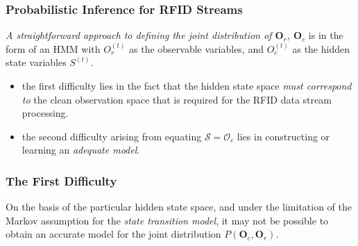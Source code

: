 
\begin{frame}
\frametitle{Probabilistic Inference for RFID Streams}

\textit{A straightforward approach to defining the joint distribution of $\mathbf{O}_r$, $\mathbf{O}_c$} is in the form of an HMM with $O^{(t)}_r$ as the observable variables, and $O^{(t)}_c$ as the hidden state variables $S^{(t)}$.

\begin{itemize}

  \item the first difficulty lies in the fact that the hidden state space \emph{must correspond to} the clean observation space that is required for the RFID data stream processing.

  \item the second difficulty arising from equating $\mathcal{S} = \mathcal{O}_c$ lies in constructing or learning an \emph{adequate model}.

\end{itemize}

\end{frame}


\begin{frame}
\frametitle{The First Difficulty}

On the basis of the particular hidden state space, and under the limitation of the Markov assumption for the \emph{state transition model}, it may not be possible to obtain an accurate model for the joint distribution $P(\mathbf{O}_c, \mathbf{O}_r)$.\\~\\

\begin{example}
\end{example}

\end{frame}

